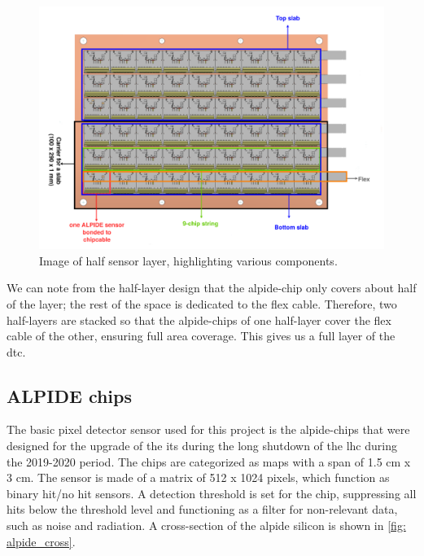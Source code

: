 \documentclass[main.tex]{subfiles}
\begin{document}
\begin{figure}[!ht]
    \centering
    \includegraphics[scale = 0.5]{images/half_tea.png}
    \caption{Image of half sensor layer, highlighting various components.\cite{Tea}}
    \label{fig: half_layer}
\end{figure}
\FloatBarrier

We can note from the half-layer design that the \gls{alpide}-chip only covers about half of the layer; the rest of the space is dedicated to the flex cable. Therefore, two half-layers are stacked so that the \gls{alpide}-chips of one half-layer cover the flex cable of the other, ensuring full area coverage. This gives us a full layer of the \gls{dtc}.


\subsection{ALPIDE chips}

The basic pixel detector sensor used for this project is the \gls{alpide}-chips that were designed for the upgrade of the \gls{its} during the long shutdown of the \gls{lhc} during the 2019-2020 period. The chips are categorized as \gls{maps} with a span of 1.5 cm x 3 cm. The sensor is made of a matrix of 512 x 1024 pixels, which function as binary hit/no hit sensors. A detection threshold is set for the chip, suppressing all hits below the threshold level and functioning as a filter for non-relevant data, such as noise and radiation. A cross-section of the \gls{alpide} silicon is shown in \autoref{fig: alpide_cross}.
\end{document}
